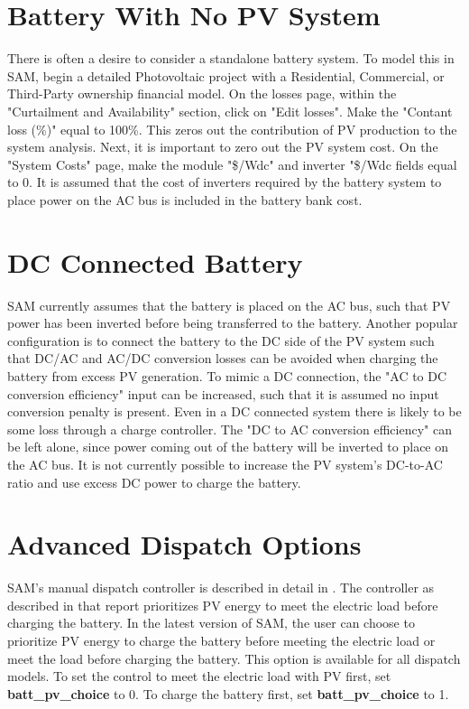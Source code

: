 \documentclass[12pt,letterpaper]{article}
\begin{document}
\section{Battery With No PV System}\label{sec-batterymodel-nopv}
There is often a desire to consider a standalone battery system.  To model this in SAM, begin a detailed Photovoltaic project with a Residential, Commercial, or Third-Party ownership financial model. On the losses page, within the "Curtailment and Availability" section, click on "Edit losses".  Make the "Contant loss (\%)" equal to 100\%.  This zeros out the contribution of PV production to the system analysis.  Next, it is important to zero out the PV system cost.  On the "System Costs" page, make the module "\$/Wdc"  and inverter "\$/Wdc fields equal to 0.  It is assumed that the cost of inverters required by the battery system to place power on the AC bus is included in the battery bank cost.

\section{DC Connected Battery}\label{sec-batterymodel-dc}
SAM currently assumes that the battery is placed on the AC bus, such that PV power has been inverted before being transferred to the battery.  Another popular configuration is to connect the battery to the DC side of the PV system such that DC/AC and AC/DC conversion losses can be avoided when charging the battery from excess PV generation.  To mimic a DC connection, the "AC to DC conversion efficiency" input can be increased, such that it is assumed no input conversion penalty is present.  Even in a DC connected system there is likely to be some loss through a charge controller.  The "DC to AC conversion efficiency" can be left alone, since power coming out of the battery will be inverted to place on the AC bus.  It is not currently possible to increase the PV system's DC-to-AC ratio and use excess DC power to charge the battery.

\section{Advanced Dispatch Options} \label{sec-batterymodel-dispatch}
SAM's manual dispatch controller is described in detail in \citep{diorio2015a}.  The controller as described in that report prioritizes PV energy to meet the electric load before charging the battery.  In the latest version of SAM, the user can choose to prioritize PV energy to charge the battery before meeting the electric load or meet the load before charging the battery.  This option is available for all dispatch models.  To set the control to meet the electric load with PV first, set \textbf{batt\_pv\_choice} to 0.  To charge the battery first, set \textbf{batt\_pv\_choice} to 1.
\end{document}
